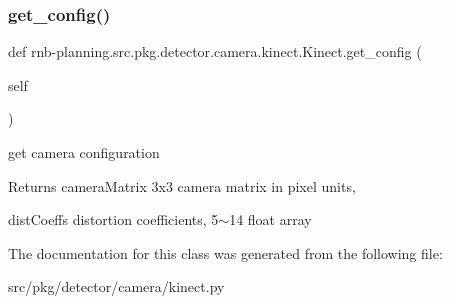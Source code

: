 \subsubsection{\texorpdfstring{get\+\_\+config()}{get\_config()}}
{\footnotesize\ttfamily def rnb-\/planning.\+src.\+pkg.\+detector.\+camera.\+kinect.\+Kinect.\+get\+\_\+config (\begin{DoxyParamCaption}\item[{}]{self }\end{DoxyParamCaption})}



get camera configuration 

\begin{DoxyReturn}{Returns}
camera\+Matrix 3x3 camera matrix in pixel units, 

dist\+Coeffs distortion coefficients, 5$\sim$14 float array 
\end{DoxyReturn}


The documentation for this class was generated from the following file\+:\begin{DoxyCompactItemize}
\item 
src/pkg/detector/camera/kinect.\+py\end{DoxyCompactItemize}
